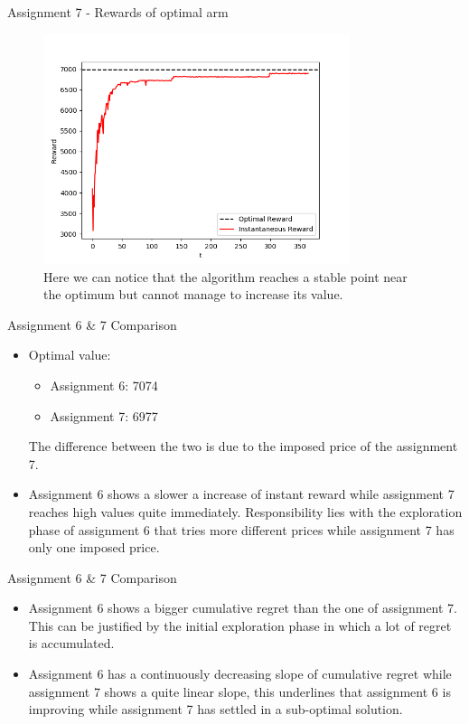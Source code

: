 \documentclass[11pt]{beamer}
\begin{document}
\begin{frame}{Assignment 7 - Rewards of optimal arm}
\begin{figure}[hbtp]
\centering
\includegraphics[width=0.8\textwidth]{images/assignment_7_regrets_arm_3_inst_reward.png}
\caption{Here we can notice that the algorithm reaches a stable point near the optimum but cannot manage to increase its value.}
\end{figure}
\end{frame}

\begin{frame}{Assignment 6 \& 7 Comparison}
	\begin{itemize}
		\item Optimal value:
		\begin{itemize}
			\item Assignment 6: 7074
			\item Assignment 7: 6977
		\end{itemize}
		The difference between the two is due to the imposed price of the assignment 7.
		\item Assignment 6 shows a slower a increase of instant reward while assignment 7 reaches high values quite immediately. Responsibility lies with the exploration phase of assignment 6 that tries more different prices while assignment 7 has only one imposed price.
	\end{itemize}
\end{frame}

\begin{frame}{Assignment 6 \& 7 Comparison}
	\begin{itemize}
		\item Assignment 6 shows a bigger cumulative regret than the one of assignment 7. This can be justified by the initial exploration phase in which a lot of regret is accumulated.
		\item Assignment 6 has a continuously decreasing slope of cumulative regret while assignment 7 shows a quite linear slope, this underlines that assignment 6 is improving while assignment 7 has settled in a sub-optimal solution.
	\end{itemize}
\end{frame}
\end{document}
